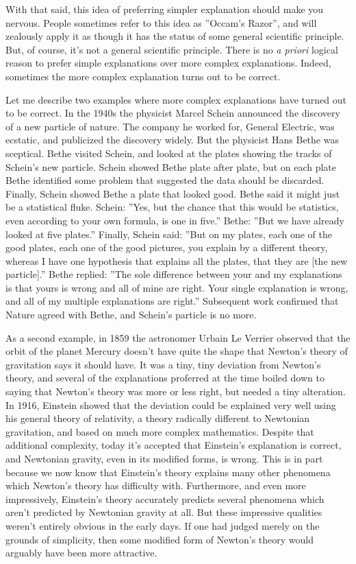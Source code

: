 With that said, this idea of preferring simpler explanation should make you nervous. People sometimes refer to this idea as ''Occam's Razor'', and will zealously apply it as though it has the status of some general scientific principle. But, of course, it's not a general scientific principle. There is no \textit{a priori} logical reason to prefer simple explanations over more complex explanations. Indeed, sometimes the more complex explanation turns out to be correct.

Let me describe two examples where more complex explanations have turned out to be correct. In the 1940s the physicist Marcel Schein announced the discovery of a new particle of nature. The company he worked for, General Electric, was ecstatic, and publicized the discovery widely. But the physicist Hans Bethe was sceptical. Bethe visited Schein, and looked at the plates showing the tracks of Schein's new particle. Schein showed Bethe plate after plate, but on each plate Bethe identified some problem that suggested the data should be discarded. Finally, Schein showed Bethe a plate that looked good. Bethe said it might just be a statistical fluke. Schein: ''Yes, but the chance that this would be statistics, even according to your own formula, is one in five.'' Bethe: ''But we have already looked at five plates.'' Finally, Schein said: ''But on my plates, each one of the good plates, each one of the good pictures, you explain by a different theory, whereas I have one hypothesis that explains all the plates, that they are [the new particle].'' Bethe replied: ''The sole difference between your and my explanations is that yours is wrong and all of mine are right. Your single explanation is wrong, and all of my multiple explanations are right.'' Subsequent work confirmed that Nature agreed with Bethe, and Schein's particle is no more.

As a second example, in 1859 the astronomer Urbain Le Verrier observed that the orbit of the planet Mercury doesn't have quite the shape that Newton's theory of gravitation says it should have. It was a tiny, tiny deviation from Newton's theory, and several of the explanations proferred at the time boiled down to saying that Newton's theory was more or less right, but needed a tiny alteration. In 1916, Einstein showed that the deviation could be explained very well using his general theory of relativity, a theory radically different to Newtonian gravitation, and based on much more complex mathematics. Despite that additional complexity, today it's accepted that Einstein's explanation is correct, and Newtonian gravity, even in its modified forms, is wrong. This is in part because we now know that Einstein's theory explains many other phenomena which Newton's theory has difficulty with. Furthermore, and even more impressively, Einstein's theory accurately predicts several phenomena which aren't predicted by Newtonian gravity at all. But these impressive qualities weren't entirely obvious in the early days. If one had judged merely on the grounds of simplicity, then some modified form of Newton's theory would arguably have been more attractive.

